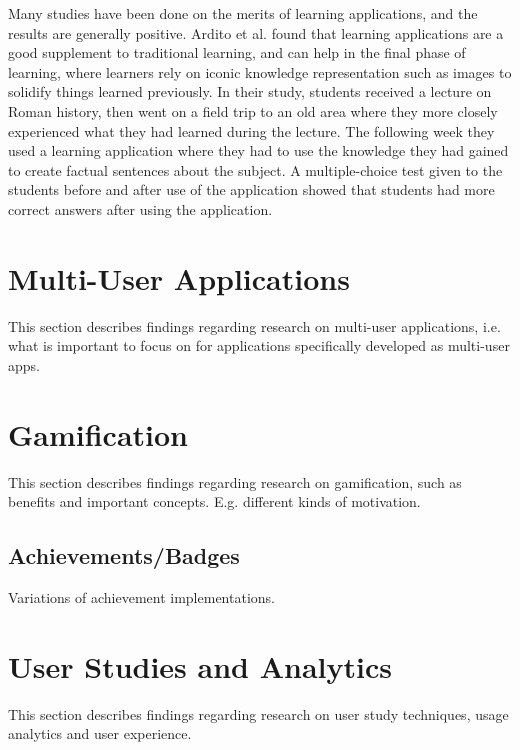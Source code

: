 Many studies have been done on the merits of learning applications, and the results are generally positive. Ardito et al.\citep{Ardito} found that learning applications are a good supplement to traditional learning, and can help in the final phase of learning, where learners rely on iconic knowledge representation such as images to solidify things learned previously. In their study, students received a lecture on Roman history, then went on a field trip to an old area where they more closely experienced what they had learned during the lecture. The following week they used a learning application where they had to use the knowledge they had gained to create factual sentences about the subject. A multiple-choice test given to the students before and after use of the application showed that students had more correct answers after using the application.


\section{Multi-User Applications}

This section describes findings regarding research on multi-user applications, i.e. what is important to focus on for applications specifically developed as multi-user apps.


\section{Gamification}

This section describes findings regarding research on gamification, such as benefits and important concepts. E.g. different kinds of motivation.

\subsection{Achievements/Badges}

Variations of achievement implementations.


\section{User Studies and Analytics}

This section describes findings regarding research on user study techniques, usage analytics and user experience.